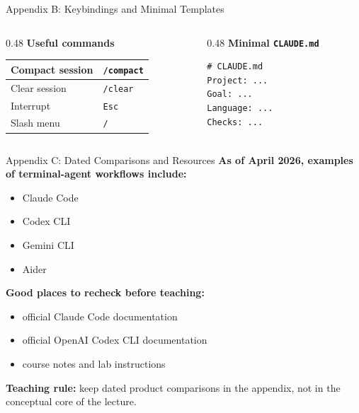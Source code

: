 \documentclass[10pt,english,aspectratio=169]{beamer}
\begin{document}
\begin{frame}[fragile]{Appendix B: Keybindings and Minimal Templates}
\begin{columns}[T]
\begin{column}{0.48\textwidth}
\textbf{Useful commands}

\vspace{0.15cm}
\footnotesize
\begin{tabular}{|l|l|}
\hline
Compact session & \texttt{/compact} \\ \hline
Clear session & \texttt{/clear} \\ \hline
Interrupt & \texttt{Esc} \\ \hline
Slash menu & \texttt{/} \\ \hline
\end{tabular}
\end{column}
\begin{column}{0.48\textwidth}
\textbf{Minimal \texttt{CLAUDE.md}}
\begin{lstlisting}[style=pythonstyle,language={},basicstyle=\ttfamily\tiny,numbers=none]
# CLAUDE.md
Project: ...
Goal: ...
Language: ...
Checks: ...
\end{lstlisting}
\end{column}
\end{columns}
\end{frame}

\begin{frame}{Appendix C: Dated Comparisons and Resources}
\textbf{As of April 2026, examples of terminal-agent workflows include:}
\begin{itemize}
    \item Claude Code
    \item Codex CLI
    \item Gemini CLI
    \item Aider
\end{itemize}

\vspace{0.25cm}

\textbf{Good places to recheck before teaching:}
\begin{itemize}
    \item official Claude Code documentation
    \item official OpenAI Codex CLI documentation
    \item course notes and lab instructions
\end{itemize}

\vspace{0.2cm}

\textbf{Teaching rule:} keep dated product comparisons in the appendix, not in the conceptual core of the lecture.
\end{frame}
\end{document}
